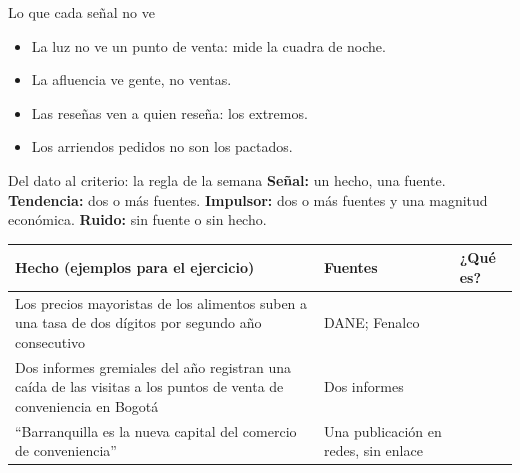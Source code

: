 \documentclass{beamer}
\begin{document}
\begin{frame}{Lo que cada señal no ve}
\medskip
\begin{itemize}
  \item La luz no ve un punto de venta: mide la cuadra de noche.
  \item La afluencia ve gente, no ventas.
  \item Las reseñas ven a quien reseña: los extremos.
  \item Los arriendos pedidos no son los pactados.
\end{itemize}
\end{frame}

\begin{frame}{Del dato al criterio: la regla de la semana}
\small
\textbf{Señal:} un hecho, una fuente. \textbf{Tendencia:} dos o más fuentes. \textbf{Impulsor:} dos o más fuentes y una magnitud económica. \textbf{Ruido:} sin fuente o sin hecho.
\medskip

\footnotesize
\begin{tabular}{@{}p{} p{} p{}@{}}
\toprule
Hecho (ejemplos para el ejercicio) & Fuentes & ¿Qué es? \\
\midrule
Los precios mayoristas de los alimentos suben a una tasa de dos dígitos por segundo año consecutivo & DANE; Fenalco & \\
Dos informes gremiales del año registran una caída de las visitas a los puntos de venta de conveniencia en Bogotá & Dos informes & \\
``Barranquilla es la nueva capital del comercio de conveniencia'' & Una publicación en redes, sin enlace & \\
\bottomrule
\end{tabular}
\medskip

\end{frame}
\end{document}
